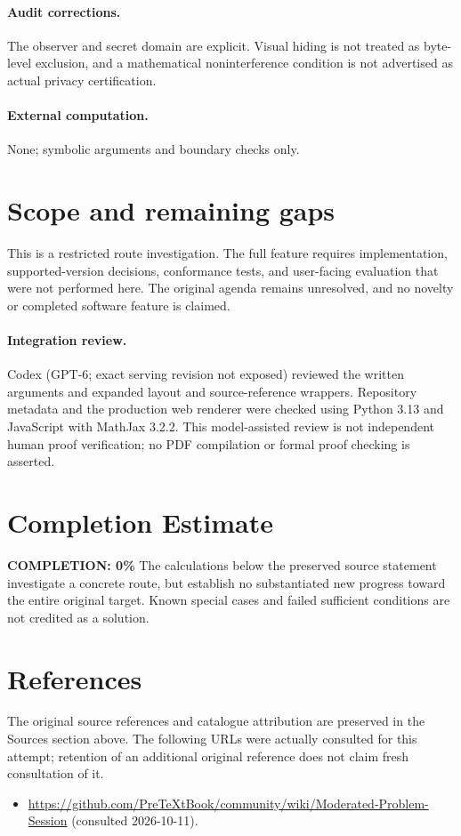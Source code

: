 \documentclass[11pt]{article}
\begin{document}
\paragraph{Audit corrections.} The observer and secret domain are explicit. Visual hiding is not treated as byte-level exclusion, and a mathematical noninterference condition is not advertised as actual privacy certification.
\paragraph{External computation.} None; symbolic arguments and boundary checks only.
\section{Scope and remaining gaps}
This is a restricted route investigation. The full feature requires implementation, supported-version decisions, conformance tests, and user-facing evaluation that were not performed here. The original agenda remains unresolved, and no novelty or completed software feature is claimed.
\paragraph{Integration review.} Codex (GPT-6; exact serving revision not exposed) reviewed the written arguments and expanded layout and source-reference wrappers. Repository metadata and the production web renderer were checked using Python 3.13 and JavaScript with MathJax 3.2.2. This model-assisted review is not independent human proof verification; no PDF compilation or formal proof checking is asserted.

\section{Completion Estimate}
\noindent\textbf{COMPLETION: 0\%}
The calculations below the preserved source statement investigate a concrete route,
but establish no substantiated new progress toward the entire original target.
Known special cases and failed sufficient conditions are not credited as a solution.
\section{References}
The original source references and catalogue attribution are preserved in the
Sources section above. The following URLs were actually consulted for this attempt;
retention of an additional original reference does not claim fresh consultation of it.
\begin{itemize}
\item \url{https://github.com/PreTeXtBook/community/wiki/Moderated-Problem-Session} (consulted 2026-10-11). 
\end{itemize}
\end{document}
